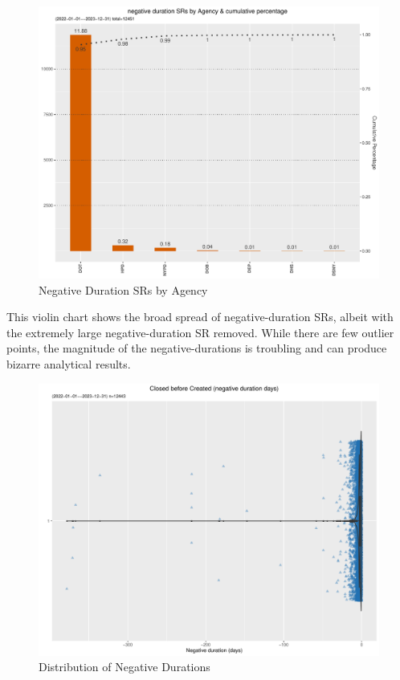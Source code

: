 \documentclass[12pt, titlepage]{article}
\begin{document}
	\begin{figure}[tbp]
	 	 \centering
	 	 \includegraphics[width = \textwidth]{negative_duration_SR_barchart.pdf}
		  \caption{Negative Duration SRs by Agency}
		  \label{fig:negative-duration}
	\end{figure}
	
	This violin chart shows the broad spread of negative-duration SRs, albeit with 
	the extremely large negative-duration SR removed. While there are few 
	outlier points, the magnitude of the negative-durations is troubling and can 
	produce bizarre analytical results.
	
	\begin{figure}[tbp]
	 	 \centering
	 	 \includegraphics[width = \textwidth]{negative_duration_SR_violin.pdf}
		 \caption{Distribution of Negative Durations}
		 \label{fig:negative-duration-violin}
	\end{figure}
\end{document}
